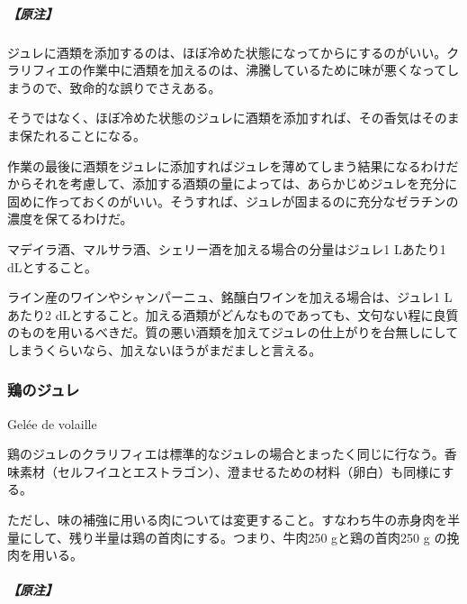\begin{recette}
\hypertarget{nota-gelees-grasses-ordinaires}{%
\subparagraph{【原注】}\label{nota-gelees-grasses-ordinaires}}

ジュレに酒類を添加するのは、ほぼ冷めた状態になってからにするのがいい。クラリフィエの作業中に酒類を加えるのは、沸騰しているために味が悪くなってしまうので、致命的な誤りでさえある。

そうではなく、ほぼ冷めた状態のジュレに酒類を添加すれば、その香気はそのまま保たれることになる。

作業の最後に酒類をジュレに添加すればジュレを薄めてしまう結果になるわけだからそれを考慮して、添加する酒類の量によっては、あらかじめジュレを充分に固めに作っておくのがいい。そうすれば、ジュレが固まるのに充分なゼラチンの濃度を保てるわけだ。

マデイラ酒、マルサラ酒、シェリー酒を加える場合の分量はジュレ1 Lあたり1
dLとすること。

ライン産のワインやシャンパーニュ、銘醸白ワインを加える場合は、ジュレ1
Lあたり2
dLとすること。加える酒類がどんなものであっても、文句ない程に良質のものを用いるべきだ。質の悪い酒類を加えてジュレの仕上がりを台無しにしてしまうくらいなら、加えないほうがまだましと言える。

\atoaki{}

\hypertarget{gelee-de-volaille}{%
\subsubsection{鶏のジュレ}\label{gelee-de-volaille}}

\begin{frsubenv}

Gelée de volaille

\end{frsubenv}


鶏のジュレのクラリフィエは標準的なジュレの場合とまったく同じに行なう。香味素材（セルフイユとエストラゴン）、澄ませるための材料（卵白）も同様にする。

ただし、味の補強に用いる肉については変更すること。すなわち牛の赤身肉を半量にして、残り半量は鶏の首肉にする。つまり、牛肉250
gと鶏の首肉250 g の挽肉を用いる。

\hypertarget{nota-gelee-de-volaile}{%
\subparagraph{【原注】}\label{nota-gelee-de-volaile}}


\end{recette}
